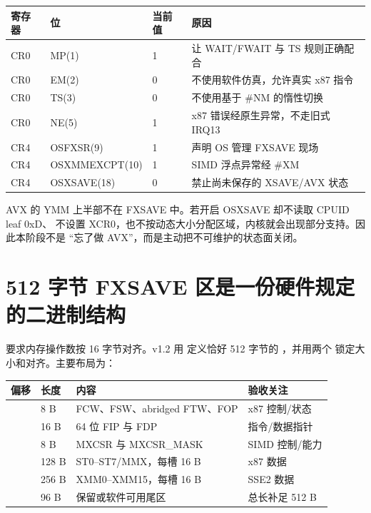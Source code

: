 \begin{longtable}{L{0.14\textwidth}L{0.24\textwidth}L{0.14\textwidth}L{0.36\textwidth}}
\toprule
寄存器 & 位 & 当前值 & 原因\\
\midrule
CR0 & MP(1) & 1 & 让 WAIT/FWAIT 与 TS 规则正确配合\\
CR0 & EM(2) & 0 & 不使用软件仿真，允许真实 x87 指令\\
CR0 & TS(3) & 0 & 不使用基于 \#NM 的惰性切换\\
CR0 & NE(5) & 1 & x87 错误经原生异常，不走旧式 IRQ13\\
CR4 & OSFXSR(9) & 1 & 声明 OS 管理 FXSAVE 现场\\
CR4 & OSXMMEXCPT(10) & 1 & SIMD 浮点异常经 \#XM\\
CR4 & OSXSAVE(18) & 0 & 禁止尚未保存的 XSAVE/AVX 状态\\
\bottomrule
\end{longtable}

AVX 的 YMM 上半部不在 FXSAVE 中。若开启 OSXSAVE 却不读取 CPUID leaf 0xD、
不设置 XCR0，也不按动态大小分配区域，内核就会出现部分支持。因此本阶段不是
“忘了做 AVX”，而是主动把不可维护的状态面关闭。

\section{512 字节 FXSAVE 区是一份硬件规定的二进制结构}

 要求内存操作数按 16 字节对齐。v1.2 用
 定义恰好 512 字节的 ，并用两个
 锁定大小和对齐。主要布局为：

\begin{longtable}{L{0.14\textwidth}L{0.15\textwidth}L{0.48\textwidth}L{0.13\textwidth}}
\toprule
偏移 & 长度 & 内容 & 验收关注\\
\midrule
{} & 8 B & FCW、FSW、abridged FTW、FOP & x87 控制/状态\\
 & 16 B & 64 位 FIP 与 FDP & 指令/数据指针\\
 & 8 B & MXCSR 与 MXCSR\_MASK & SIMD 控制/能力\\
 & 128 B & ST0--ST7/MMX，每槽 16 B & x87 数据\\
 & 256 B & XMM0--XMM15，每槽 16 B & SSE2 数据\\
 & 96 B & 保留或软件可用尾区 & 总长补足 512 B\\
\bottomrule
\end{longtable}

